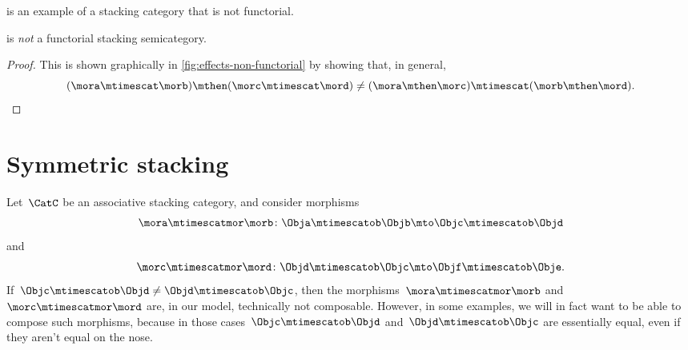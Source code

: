 \Effects is an example of a stacking category that is not functorial.

\begin{lemma}
    \Effects is \emph{not} a functorial stacking semicategory.
\end{lemma}

\begin{proof}
    This is shown graphically in \cref{fig:effects-non-functorial} by showing that, in general,
    \begin{equation*}
        (\mora \mtimescat \morb )
        \mthen (\morc \mtimescat \mord )
        \neq
        (\mora \mthen \morc ) \mtimescat (\morb \mthen \mord ).
    \end{equation*}
\end{proof}

\begin{figure*}[b]
    \centering
    \caption{Proof that \Effects is not a functorial stacking category by showing that
        the two morphisms above have different representations in \SetL.}
    \label{fig:effects-non-functorial}
\end{figure*}

\section{Symmetric stacking}

Let~$\CatC$ be an associative stacking category, and consider morphisms
\begin{equation*}
    \mora \mtimescatmor \morb \colon \Obja \mtimescatob \Objb \mto \Objc \mtimescatob \Objd
\end{equation*}
and~
\begin{equation*}
    \morc \mtimescatmor \mord \colon \Objd \mtimescatob \Objc \mto \Objf \mtimescatob \Obje.
\end{equation*}
If~$\Objc \mtimescatob \Objd \neq \Objd \mtimescatob \Objc$, then the morphisms~$\mora \mtimescatmor \morb$ and~$\morc \mtimescatmor \mord$ are, in our model, technically not composable.
However, in some examples, we will in fact want to be able to compose such morphisms, because in those cases~$\Objc \mtimescatob \Objd$ and~$\Objd \mtimescatob \Objc$ are essentially equal, even if they aren't equal on the nose.

